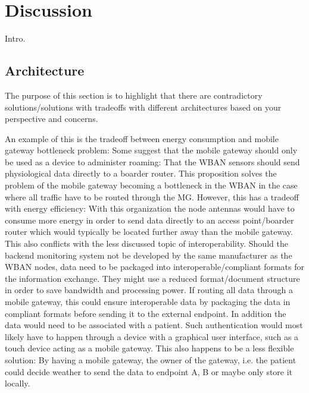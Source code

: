\section{Discussion} %
\label{sec:discussion}

Intro.



\subsection{Architecture} %
\label{sub:architecture}

The purpose of this section is to highlight that there are contradictory solutions/solutions with tradeoffs with different architectures based on your perspective and concerns. 

An example of this is the tradeoff between energy consumption and mobile gateway bottleneck problem: Some suggest that the mobile gateway should only be used as a device to administer roaming: That the WBAN sensors should send physiological data directly to a boarder router. This proposition solves the problem of the mobile gateway becoming a bottleneck in the WBAN in the case where all traffic have to be routed through the MG. However, this has a tradeoff with energy efficiency: With this organization the node antennas would have to consume more energy in order to send data directly to an access point/boarder router which would typically be located further away than the mobile gateway. This also conflicts with the less discussed topic of interoperability. Should the backend monitoring system not be developed by the same manufacturer as the WBAN nodes, data need to be packaged into interoperable/compliant formats for the information exchange. They might use a reduced format/document structure in order to save bandwidth and processing power. If routing all data through a mobile gateway, this could ensure interoperable data by packaging the data in compliant formats before sending it to the external endpoint. In addition the data would need to be associated with a patient. Such authentication would most likely have to happen through a device with a graphical user interface, such as a touch device acting as a mobile gateway. This also happens to be a less flexible solution: By having a mobile gateway, the owner of the gateway, i.e. the patient could decide weather to send the data to endpoint A, B or maybe only store it locally.

